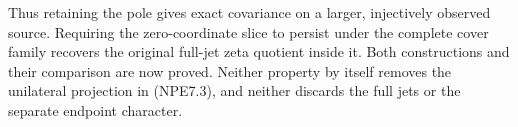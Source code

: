 Thus retaining the pole gives exact covariance on a larger, injectively
observed source. Requiring the zero-coordinate slice to persist under
the complete cover family recovers the original full-jet zeta quotient
inside it. Both constructions and their comparison are now proved.
Neither property by itself removes the unilateral projection in
(NPE7.3), and neither discards the full jets or the separate endpoint
character.
